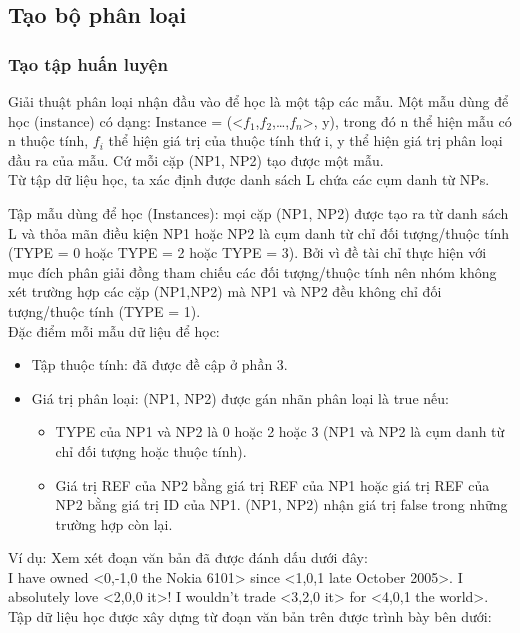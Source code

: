 \documentclass[12pt]{extarticle}
\begin{document}
		\subsection{Tạo bộ phân loại}
			\subsubsection*{Tạo tập huấn luyện}
				\par Giải thuật phân loại nhận đầu vào để học là một tập các mẫu. Một mẫu dùng để học (instance) có dạng: Instance = (<$f_1$,$f_2$,…,$f_n$>, y), trong đó n thể hiện mẫu có n thuộc tính, $f_i$ thể hiện giá trị của thuộc tính thứ i, y thể hiện giá trị phân loại đầu ra của mẫu. Cứ mỗi cặp (NP1, NP2) tạo được một mẫu. 
				\\Từ tập dữ liệu học, ta xác định được danh sách L chứa các cụm danh từ NPs.
				\par Tập mẫu dùng để học (Instances): mọi cặp (NP1, NP2) được tạo ra từ danh sách L và thỏa mãn điều kiện NP1 hoặc NP2 là cụm danh từ chỉ đối tượng/thuộc tính (TYPE = 0 hoặc TYPE = 2 hoặc TYPE = 3). Bởi vì đề tài chỉ thực hiện với mục đích phân giải đồng tham chiếu các đối tượng/thuộc tính nên nhóm không xét trường hợp các cặp (NP1,NP2) mà NP1 và NP2 đều không chỉ đối tượng/thuộc tính (TYPE = 1).
				\\Đặc điểm mỗi mẫu dữ liệu để học:
				\begin{itemize}
					\item{Tập thuộc tính: đã được đề cập ở phần 3.}
					\item{Giá trị phân loại: (NP1, NP2) được gán nhãn phân loại là true nếu:
						\begin{itemize}
							\item{TYPE của NP1 và NP2 là 0 hoặc 2 hoặc 3 (NP1 và NP2 là cụm danh từ chỉ đối tượng hoặc thuộc tính).}
							\item{Giá trị REF của NP2 bằng giá trị REF của NP1 hoặc giá trị REF của NP2 bằng giá trị ID của NP1. (NP1, NP2) nhận giá trị false trong những trường hợp còn lại.}
						\end{itemize}}
				\end{itemize}
				\par Ví dụ: Xem xét đoạn văn bản đã được đánh dấu dưới đây:
				\\I have owned <0,-1,0 the Nokia 6101> since <1,0,1 late October 2005>. I absolutely love <2,0,0 it>! I wouldn't trade <3,2,0 it> for <4,0,1 the world>.
				\\Tập dữ liệu học được xây dựng từ đoạn văn bản trên được trình bày bên dưới:
\end{document}
